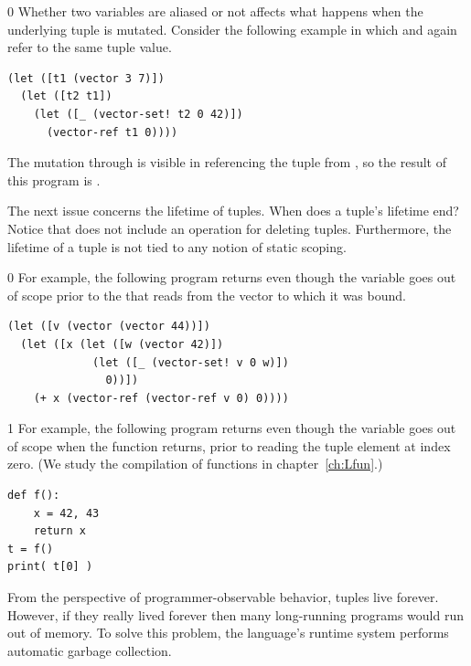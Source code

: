 \documentclass[7x10]{TimesAPriori_MIT}%
\def\racketEd{0}
\def\pythonEd{1}
\def\edition{1}
\newcommand{\pythonColor}[0]{}
\numberwithin{theorem}{chapter}
\numberwithin{definition}{chapter}
\numberwithin{equation}{chapter}
\begin{document}
{\if\edition\racketEd        
Whether two variables are aliased or not affects what happens
when the underlying tuple is mutated.
Consider the following example in which  and 
again refer to the same tuple value.
\begin{center}
\begin{minipage}{0.96\textwidth}
\begin{lstlisting}
(let ([t1 (vector 3 7)])
  (let ([t2 t1])
    (let ([_ (vector-set! t2 0 42)])
      (vector-ref t1 0))))
\end{lstlisting}
\end{minipage}
\end{center}
The mutation through  is visible in referencing the tuple
from , so the result of this program is .
\fi}

The next issue concerns the lifetime of tuples. When does a tuple's
lifetime end?  Notice that \LangVec{} does not include an operation
for deleting tuples. Furthermore, the lifetime of a tuple is not tied
to any notion of static scoping.
%
{\if\edition\racketEd        
%
For example, the following program returns  even though the
variable  goes out of scope prior to the 
that reads from the vector to which it was bound.
\begin{center}
\begin{minipage}{0.96\textwidth}
\begin{lstlisting}
(let ([v (vector (vector 44))])
  (let ([x (let ([w (vector 42)])
             (let ([_ (vector-set! v 0 w)])
               0))])
    (+ x (vector-ref (vector-ref v 0) 0))))
\end{lstlisting}
\end{minipage}
\end{center}
\fi}
%
{\if\edition\pythonEd\pythonColor
%
For example, the following program returns  even though the
variable  goes out of scope when the function returns, prior
to reading the tuple element at index zero. (We study the compilation
of functions in chapter~\ref{ch:Lfun}.)
%  
\begin{center}
\begin{minipage}{0.96\textwidth}
\begin{lstlisting}
def f():
    x = 42, 43
    return x
t = f()
print( t[0] )
\end{lstlisting}
\end{minipage}
\end{center}
\fi}
%
From the perspective of programmer-observable behavior, tuples live
forever. However, if they really lived forever then many long-running
programs would run out of memory. To solve this problem, the
language's runtime system performs automatic garbage collection.
\end{document}
